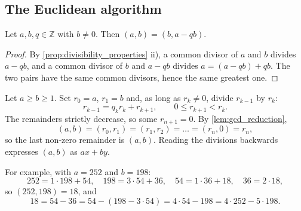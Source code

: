 \subsection{The Euclidean algorithm}
\begin{lemma}\label{lem:gcd_reduction}
    Let $a,b,q \in \mathbb{Z}$ with $b \neq 0$. Then $(a,b) = (b, a - qb)$.
\end{lemma}
\begin{proof}
    By \cref{prop:divisibility_properties} ii), a common divisor of $a$ and $b$ divides $a - qb$, and a common divisor of $b$ and $a - qb$ divides $a = (a - qb) + qb$. The two pairs have the same common divisors, hence the same greatest one.
\end{proof}

Let $a \ge b \ge 1$. Set $r_0 = a$, $r_1 = b$ and, as long as $r_k \neq 0$, divide $r_{k-1}$ by $r_k$:
\begin{equation*}
    r_{k-1} = q_k r_k + r_{k+1}, \qquad 0 \le r_{k+1} < r_k.
\end{equation*}
The remainders strictly decrease, so some $r_{n+1} = 0$. By \cref{lem:gcd_reduction},
\begin{equation*}
    (a,b) = (r_0,r_1) = (r_1,r_2) = \dots = (r_n, 0) = r_n,
\end{equation*}
so the last non-zero remainder is $(a,b)$. Reading the divisions backwards expresses $(a,b)$ as $ax + by$.

For example, with $a = 252$ and $b = 198$:
\begin{equation*}
    252 = 1 \cdot 198 + 54, \quad 198 = 3 \cdot 54 + 36, \quad 54 = 1 \cdot 36 + 18, \quad 36 = 2 \cdot 18,
\end{equation*}
so $(252,198) = 18$, and
\begin{equation*}
    18 = 54 - 36 = 54 - (198 - 3 \cdot 54) = 4 \cdot 54 - 198 = 4 \cdot 252 - 5 \cdot 198.
\end{equation*}
